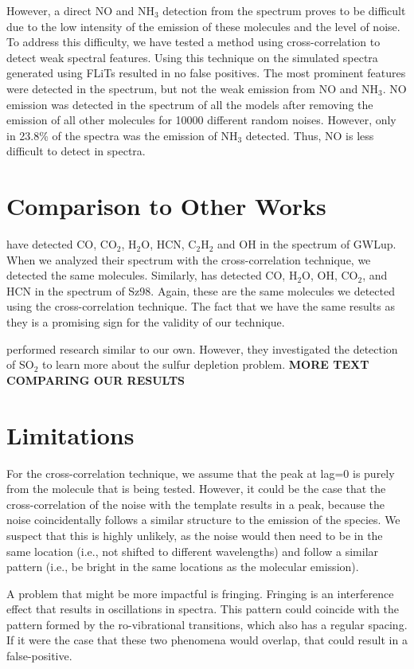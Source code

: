 \documentclass[oneside, single, authoryear, semicolon, 12pt]{lion-msc}
\newcommand{\4}{$_4$}
\newcommand{\3}{$_3$}
\newcommand{\2}{$_2$}
\begin{document}
However, a direct NO and NH\3 detection from the spectrum proves to be difficult due to the low intensity of the emission of these molecules and the level of noise. To address this difficulty, we have tested a method using cross-correlation to detect weak spectral features. Using this technique on the simulated spectra generated using FLiTs resulted in no false positives. The most prominent features were detected in the spectrum, but not the weak emission from NO and NH\3. NO emission was detected in the spectrum of all the models after removing the emission of all other molecules for 10000 different random noises. However, only in 23.8\% of the spectra was the emission of NH\3 detected. Thus, NO is less difficult to detect in spectra.


\section{Comparison to Other Works}
\cite{Grant_2023} have detected CO, CO\2, H\2O, HCN, C\2H\2 and OH in the spectrum of GWLup. When we analyzed their spectrum with the cross-correlation technique, we detected the same molecules. Similarly, \cite{Gasman_2023} has detected CO, H\2O, OH, CO\2, and HCN in the spectrum of Sz98. Again, these are the same molecules we detected using the cross-correlation technique. The fact that we have the same results as they is a promising sign for the validity of our technique. 

\cite{groningenthesis} performed research similar to our own. However, they investigated the detection of SO\2 to learn more about the sulfur depletion problem. \textbf{MORE TEXT COMPARING OUR RESULTS}

\section{Limitations}
For the cross-correlation technique, we assume that the peak at lag=0 is purely from the molecule that is being tested. However, it could be the case that the cross-correlation of the noise with the template results in a peak, because the noise coincidentally follows a similar structure to the emission of the species. We suspect that this is highly unlikely, as the noise would then need to be in the same location (i.e., not shifted to different wavelengths) and follow a similar pattern (i.e., be bright in the same locations as the molecular emission). 

A problem that might be more impactful is fringing. Fringing is an interference effect that results in oscillations in spectra. This pattern could coincide with the pattern formed by the ro-vibrational transitions, which also has a regular spacing. If it were the case that these two phenomena would overlap, that could result in a false-positive.
\end{document}
